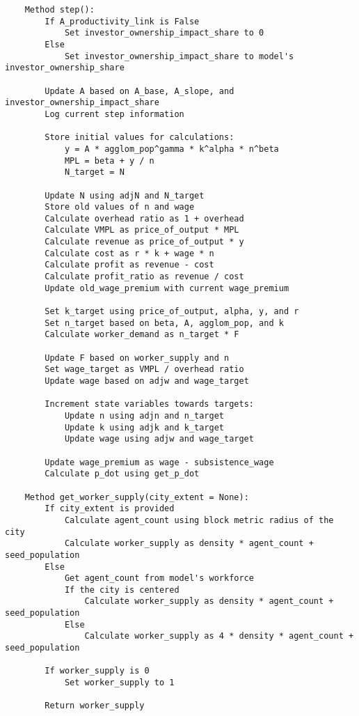 {\begin{verbatim}
    Method step():
        If A_productivity_link is False
            Set investor_ownership_impact_share to 0
        Else
            Set investor_ownership_impact_share to model's investor_ownership_share
        
        Update A based on A_base, A_slope, and investor_ownership_impact_share
        Log current step information
        
        Store initial values for calculations:
            y = A * agglom_pop^gamma * k^alpha * n^beta
            MPL = beta + y / n
            N_target = N
        
        Update N using adjN and N_target
        Store old values of n and wage
        Calculate overhead ratio as 1 + overhead
        Calculate VMPL as price_of_output * MPL
        Calculate revenue as price_of_output * y
        Calculate cost as r * k + wage * n
        Calculate profit as revenue - cost
        Calculate profit_ratio as revenue / cost
        Update old_wage_premium with current wage_premium
        
        Set k_target using price_of_output, alpha, y, and r
        Set n_target based on beta, A, agglom_pop, and k
        Calculate worker_demand as n_target * F
        
        Update F based on worker_supply and n
        Set wage_target as VMPL / overhead ratio
        Update wage based on adjw and wage_target
        
        Increment state variables towards targets:
            Update n using adjn and n_target
            Update k using adjk and k_target
            Update wage using adjw and wage_target
            
        Update wage_premium as wage - subsistence_wage
        Calculate p_dot using get_p_dot

    Method get_worker_supply(city_extent = None):
        If city_extent is provided
            Calculate agent_count using block metric radius of the city
            Calculate worker_supply as density * agent_count + seed_population
        Else
            Get agent_count from model's workforce
            If the city is centered
                Calculate worker_supply as density * agent_count + seed_population
            Else
                Calculate worker_supply as 4 * density * agent_count + seed_population
        
        If worker_supply is 0
            Set worker_supply to 1
        
        Return worker_supply


\end{verbatim}}

